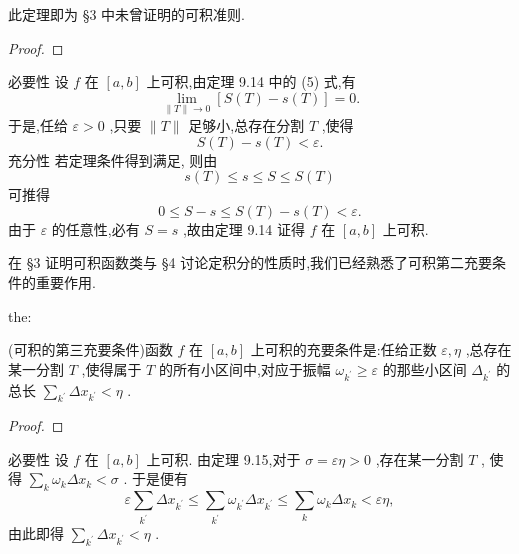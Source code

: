 此定理即为 §3 中未曾证明的可积准则.

\begin{proof}

\end{proof}
必要性 设 \(f\) 在 \(\left\lbrack  {a,b}\right\rbrack\) 上可积,由定理 9.14 中的 (5) 式,有
\[
\mathop{\lim }\limits_{{\parallel T\parallel  \rightarrow  0}}\left\lbrack  {S\left( T\right)  - s\left( T\right) }\right\rbrack   = 0.
\]
于是,任给 \(\varepsilon  > 0\) ,只要 \(\parallel T\parallel\) 足够小,总存在分割 \(T\) ,使得
\[
S\left( T\right)  - s\left( T\right)  < \varepsilon .
\]
充分性 若定理条件得到满足, 则由
\[
s\left( T\right)  \leq  s \leq  S \leq  S\left( T\right)
\]
可推得
\[
0 \leq  S - s \leq  S\left( T\right)  - s\left( T\right)  < \varepsilon .
\]
由于 \(\varepsilon\) 的任意性,必有 \(S = s\) ,故由定理 9.14 证得 \(f\) 在 \(\left\lbrack  {a,b}\right\rbrack\) 上可积.

在 §3 证明可积函数类与 §4 讨论定积分的性质时,我们已经熟悉了可积第二充要条件的重要作用.

\begin{theorem}{}{the:}

\end{theorem}
(可积的第三充要条件)函数 \(f\) 在 \(\left\lbrack  {a,b}\right\rbrack\) 上可积的充要条件是:任给正数 \(\varepsilon ,\eta\) ,总存在某一分割 \(T\) ,使得属于 \(T\) 的所有小区间中,对应于振幅 \({\omega }_{{k}^{\prime }} \geq  \varepsilon\) 的那些小区间 \({\Delta }_{{k}^{\prime }}\) 的总长 \(\mathop{\sum }\limits_{{k}^{\prime }}\Delta {x}_{{k}^{\prime }} < \eta\) .

\begin{proof}

\end{proof}
必要性 设 \(f\) 在 \(\left\lbrack  {a,b}\right\rbrack\) 上可积. 由定理 9.15,对于 \(\sigma  = {\varepsilon \eta } > 0\) ,存在某一分割 \(T\) , 使得 \(\mathop{\sum }\limits_{k}{\omega }_{k}\Delta {x}_{k} < \sigma\) . 于是便有
\[
\varepsilon \mathop{\sum }\limits_{{k}^{\prime }}\Delta {x}_{{k}^{\prime }} \leq  \mathop{\sum }\limits_{{k}^{\prime }}{\omega }_{{k}^{\prime }}\Delta {x}_{{k}^{\prime }} \leq  \mathop{\sum }\limits_{k}{\omega }_{k}\Delta {x}_{k} < {\varepsilon \eta },
\]
由此即得 \(\mathop{\sum }\limits_{{k}^{\prime }}\Delta {x}_{{k}^{\prime }} < \eta\) .

